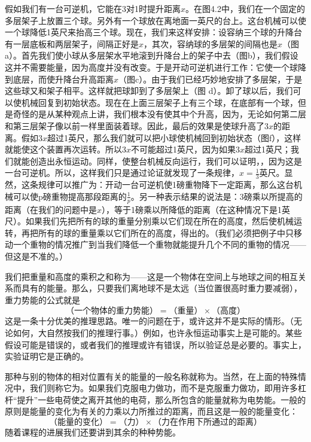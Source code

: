 假如我们有一台可逆机，它能在3对1时提升距离$ x $。在图4.2中，我们在一个固定的多层架子上放置三个球。另外有一个球放在离地面一英尺的台上。这台机械可以使一个球降低1英尺来抬高三个球。现在，我们来这样安排：设容纳三个球的升降台有一层底板和两层架子，间隔正好是$ x $，其次，容纳球的多层架的间隔也是$ x $（图a）。首先我们使小球从多层架水平地滚到升降台上的架子中去（图b），我们假设这并不需要能量，因为高度并没有改变。于是开动可逆机进行工作：它使一个球降到底层，而使升降台升高距离$ x $（图c）。由于我们已经巧妙地安排了多层架，于是这些球又和架子相平。这样就把球卸到了多层架上（图 d）。卸了球以后，我们可以使机械回复到初始状态。现在在上面三层架子上有三个球，在底部有一个球，但是奇怪的是从某种观点上讲，我们根本没有使其中个升高，因为，无论如何第二层和第三层架子像以前一样里面装着球。因此，最后的效果是使球升高了$ 3x$的距离。假如$  3x $超过1英尺，那么我们就可以把小球使机械回到初始状态（图f），这样就能使这个装置再次运转。所以$ 3x $不可能超过1英尺，因为如果$ 3x $超过1英尺；我们就能创造出永恒运动。同样，使整台机械反向运行，我们可以证明，，因为这是一台可逆机。所以，这样我们只是通过论证就发现了一条规律，$ x=\frac{1}{3} $英尺。显然，这条规律可以推广为：开动一台可逆机使1磅重物降下一定距离，那么这台机械可以使p磅重物提高那段距离的$ \frac{1}{p} $。另一种表示结果的说法是：3磅乘以所提高的距离（在我们的问题中是$ x $），等于1磅乘以所降低的距离（在这种情况下是1英尺）。如果我们先把所有的球的重量分别乘以它们现在所在的高度，然后使机械运转，再把所有的球的重量乘以它们所在的高度，得出的。（我们必须把例子中只移动一个重物的情况推广到当我们降低一个重物就能提升几个不同的重物的情况——但这是不准的。）

我们把重量和高度的乘积之和称为——这是一个物体在空间上与地球之间的相互关系而具有的能量。那么，只要我们离地球不是太远（当位置很高时重力要减弱），重力势能的公式就是
\begin{equation}
    \label{Eq:I:4:3}
    \text{（一个物体的重力势能）}=
    \text{（重量）}\times\text{（高度）}
\end{equation}
这是一条十分优美的推理思路。唯一的问题在于，或许这并不是实际的情形。（无论如何，大自然按我们的推理行事。）例如，也许永恒运动事实上是可能的。某些假设可能是错误的，或者我们的推理或许有错误，所以验证总是必要的。事实上，实验证明它是正确的。

那种与别的物体的相对位置有关的能量的一般名称就称为。当然，在上面的特殊情况中，我们则称它为。如果我们克服电力做功，而不是克服重力做功，即用许多杠杆“提升”一些电荷使之离开其他的电荷，那么所包含的能量就称为电势能。一般的原则是能量的变化为有关的力乘以力所推过的距离，而且这是一般的能量变化：
\begin{equation}
    \label{Eq:I:4:4}
    \text{（能量的变化）}=
    \text{（力）}\times\text{（力在作用下所通过的距离）}
\end{equation}
随着课程的进展我们还要讲到其余的种种势能。

